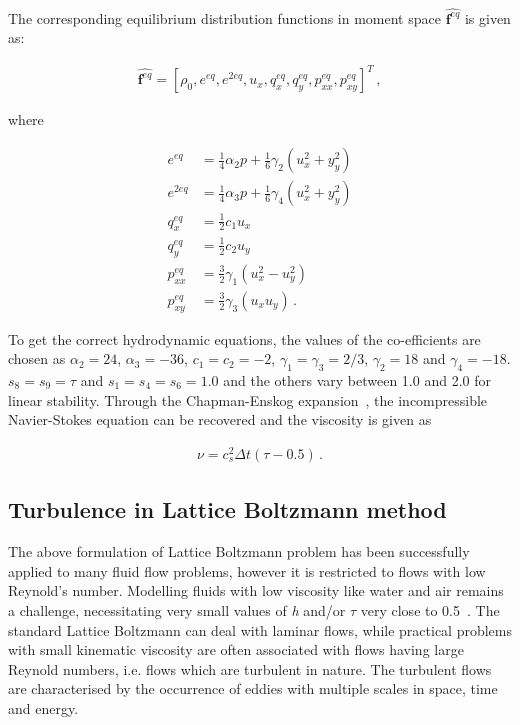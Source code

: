 The corresponding equilibrium distribution functions in moment space 
$\widehat{\mathbf{f}^{eq}}$ is given as:

\begin{align}
\widehat{\mathbf{f}^{eq}}=\left[\rho_0,e^{eq}, 
e^{2eq},u_x,q_x^{eq},q_y^{eq},p_{xx}^{eq},p_{xy}^{eq}\right]^T\,,
\end{align}

\noindent where

\begin{align}
e^{eq} & = \frac{1}{4}\alpha_2p+\frac{1}{6}\gamma_2(u_x^2+y_y^2)\\
e^{2eq} & = \frac{1}{4}\alpha_3p+\frac{1}{6}\gamma_4(u_x^2+y_y^2)\\
q_x^{eq} & = \frac{1}{2}c_1u_x\\
q_y^{eq} & = \frac{1}{2}c_2u_y \\
p_{xx}^{eq} & = \frac{3}{2}\gamma_1(u_x^2 - u_y^2)\\
p_{xy}^{eq} & = \frac{3}{2}\gamma_3(u_xu_y) \,.
\end{align}

To get the correct hydrodynamic equations, the values of the co-efficients are 
chosen as $\alpha_2=24$,  $\alpha_3=-36$, $c_1=c_2=-2$, 
$\gamma_1=\gamma_3=2/3$, $\gamma_2=18$ and $\gamma_4=-18$. $s_8 = s_9 = \tau$ 
and $s_1=s_4=s_6=1.0$ and the others vary between 1.0 and 2.0 for linear 
stability. Through the Chapman-Enskog expansion~\citep{Du2006}, the 
incompressible Navier-Stokes equation can be recovered and the viscosity is 
given as

\begin{align}
\nu=c_s^2\Delta t(\tau-0.5)\,.
\end{align}


\subsection{Turbulence in Lattice Boltzmann method}

The above formulation of Lattice Boltzmann problem has been successfully 
applied to many fluid flow problems, however it is restricted to flows with low 
Reynold's number. Modelling fluids with low viscosity like water and air 
remains a challenge, necessitating very small values of \textit{h} and/or 
$\tau$ very close to 0.5~\citep{He1997}. The standard Lattice Boltzmann can 
deal with laminar flows, while practical problems with small kinematic 
viscosity are often associated with flows having large Reynold numbers, i.e. 
flows which are turbulent in nature. The turbulent flows are characterised by 
the occurrence of eddies with multiple scales in space, time and energy.

